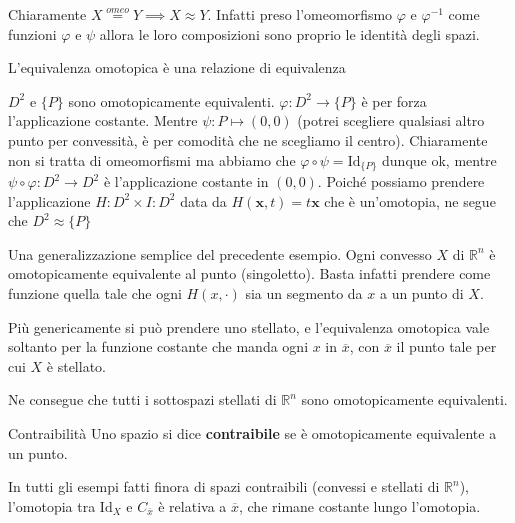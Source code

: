 \begin{remark}
    Chiaramente \(X \overset{omeo}{=} Y \implies X \approx Y\). Infatti preso
    l'omeomorfismo \(\varphi \) e \(\varphi ^{-1}\) come funzioni \(\varphi \) e
    \(\psi\) allora le loro composizioni sono proprio le identità degli spazi.
\end{remark}
\begin{remark}
    L'equivalenza omotopica è una relazione di equivalenza
\end{remark}

\begin{example}
    \(D^2\) e \(\{P\}\) sono omotopicamente equivalenti.
    \(\varphi : D^2 \to \{P\} \) è per forza l'applicazione costante.
    Mentre \(\psi: P \mapsto (0,0)\) (potrei scegliere qualsiasi altro punto per
    convessità, è per comodità che ne scegliamo il centro). Chiaramente non si
    tratta di omeomorfismi ma abbiamo che \(\varphi \circ \psi =
    \mathrm{Id}_{\{P\} } \) dunque ok, mentre \(\psi \circ \varphi : D^2 \to D^2
    \) è l'applicazione costante in \({(0,0)}\). Poiché possiamo prendere
    l'applicazione \(H : D^2 \times I : D^2\) data da \(H(\mathbf{x} , t) = t
    \mathbf{x} \) che è un'omotopia, ne segue che \(D^2 \approx \{P\} \) 
\end{example}

\begin{example}
    Una generalizzazione semplice del precedente esempio. Ogni convesso \(X\) di
    \(\mathbb{R}^{n}\) è omotopicamente equivalente al punto (singoletto). Basta
    infatti prendere come funzione quella tale che ogni \(H(x, \cdot )\) sia un
    segmento da \(x\) a un punto di \(X\).

    Più genericamente si può prendere uno stellato, e l'equivalenza omotopica
    vale soltanto per la funzione costante che manda ogni \(x\) in
    \(\overline{x}\), con \(\overline{x}\) il punto tale per cui \(X\) è
    stellato. 

    Ne consegue che tutti i sottospazi stellati di \(\mathbb{R}^{n}\) sono
    omotopicamente equivalenti.
\end{example}
\begin{definition}{Contraibilità}
    Uno spazio si dice \textbf{contraibile} se è omotopicamente equivalente a un
    punto.
\end{definition}
\begin{note}
    In tutti gli esempi fatti finora di spazi contraibili (convessi e stellati
    di \(\mathbb{R}^{n}\)), l'omotopia tra \(\mathrm{Id}_X\) e
    \(C_{\overline{x}} \) è relativa a \(\overline{x}\), che rimane costante
    lungo l'omotopia.
\end{note}

